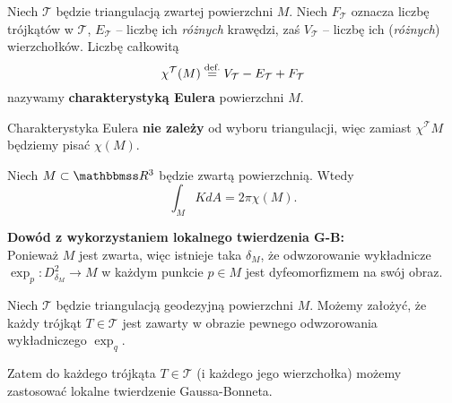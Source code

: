 \begin{frame}

\begin{definicja}
Niech $\mathcal{T}$ będzie triangulacją zwartej powierzchni $M$. Niech $F_\mathcal{T}$ oznacza liczbę trójkątów w $\mathcal{T}$, $E_\mathcal{T}$ -- liczbę ich \textit{różnych} krawędzi, zaś $V_\mathcal{T}$ -- liczbę ich (\textit{różnych}) wierzchołków. \pause Liczbę całkowitą
\[\chi^\mathcal{T}(M)\define V_\mathcal{T}-E_\mathcal{T}+F_\mathcal{T}\]nazywamy \textbf{charakterystyką Eulera} powierzchni $M$.
\end{definicja}

\pause \begin{uwaga}
Charakterystyka Eulera \textbf{nie zależy} od wyboru triangulacji, więc zamiast $\chi^\mathcal{T}M$ będziemy pisać $\chi(M)$. 
\end{uwaga}

\end{frame}
\begin{frame}

\begin{twierdzenie}
Niech $M\subset \R^3$ będzie zwartą powierzchnią. Wtedy 
\[\int_M K dA=2\pi \chi(M).\]
\end{twierdzenie}

\end{frame}
\begin{frame}
\textcolor{ared}{\textbf{Dowód z wykorzystaniem lokalnego twierdzenia 
G-B: }}\\\pause
{}
Ponieważ $M$ jest zwarta, więc istnieje taka $\delta_M$, że odwzorowanie wykładnicze $\exp_p\colon D^2_{\delta_M}\to M$ w każdym punkcie $p\in M$ jest dyfeomorfizmem na swój obraz.\pause 

Niech $\mathcal{T}$ będzie triangulacją geodezyjną powierzchni $M$. Możemy założyć, że każdy trójkąt $T\in \mathcal{T}$ jest zawarty w obrazie pewnego odwzorowania wykładniczego $\exp_q$.\pause 

Zatem do każdego trójkąta $T\in \mathcal{T}$ (i każdego jego wierzchołka) możemy zastosować lokalne twierdzenie Gaussa-Bonneta.


\end{frame}

